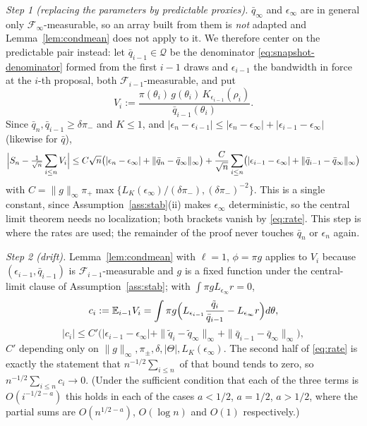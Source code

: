 \documentclass[10pt]{article}
\theoremstyle{plain}
\theoremstyle{definition}
\begin{document}
\emph{Step 1 (replacing the parameters by predictable proxies).} $\bar q_\infty$ and $\epsilon_\infty$ are in general only $\mathcal{F}_\infty$-measurable, so an array built from them is \emph{not} adapted and Lemma~\ref{lem:condmean} does not apply to it. We therefore center on the predictable pair instead: let $\bar q_{i-1}\in\mathcal{Q}$ be the denominator \eqref{eq:snapshot-denominator} formed from the first $i-1$ draws and $\epsilon_{i-1}$ the bandwidth in force at the $i$-th proposal, both $\mathcal{F}_{i-1}$-measurable, and put
\[
V_i:=\frac{\pi(\theta_i)\,g(\theta_i)\,K_{\epsilon_{i-1}}(\rho_i)}{\bar q_{i-1}(\theta_i)} .
\]
Since $\bar q_n,\bar q_{i-1}\ge\delta\pi_-$ and $K\le1$, and $|\epsilon_n-\epsilon_{i-1}|\le|\epsilon_n-\epsilon_\infty|+|\epsilon_{i-1}-\epsilon_\infty|$ (likewise for $\bar q$),
\[
\Bigl|S_n-\tfrac{1}{\sqrt n}\sum_{i\le n}V_i\Bigr|
\le C\sqrt n\bigl(|\epsilon_n-\epsilon_\infty|+\|\bar q_n-\bar q_\infty\|_\infty\bigr)
+\frac{C}{\sqrt n}\sum_{i\le n}\bigl(|\epsilon_{i-1}-\epsilon_\infty|+\|\bar q_{i-1}-\bar q_\infty\|_\infty\bigr)
\]
with $C=\|g\|_\infty\pi_+\max\{L_K(\epsilon_\infty)/(\delta\pi_-),(\delta\pi_-)^{-2}\}$. This is a single constant, since Assumption~\ref{ass:stab}(ii) makes $\epsilon_\infty$ deterministic, so the central limit theorem needs no localization; both brackets vanish by \eqref{eq:rate}. This step is where the rates are used; the remainder of the proof never touches $\bar q_n$ or $\epsilon_n$ again.

\emph{Step 2 (drift).} Lemma~\ref{lem:condmean} with $\ell=1$, $\phi=\pi g$ applies to $V_i$ because $(\epsilon_{i-1},\bar q_{i-1})$ is $\mathcal{F}_{i-1}$-measurable and $g$ is a fixed function under the central-limit clause of Assumption~\ref{ass:stab}; with $\int\pi gL_{\epsilon_\infty}r=0$,
\[
c_i:=\mathbb{E}_{i-1}V_i=\int\pi g\Bigl(L_{\epsilon_{i-1}}\frac{\tilde q_i}{\bar q_{i-1}}-L_{\epsilon_\infty}r\Bigr)d\theta,
\]
\[
|c_i|\le C'\bigl(|\epsilon_{i-1}-\epsilon_\infty|+\|\tilde q_i-\tilde q_\infty\|_\infty+\|\bar q_{i-1}-\bar q_\infty\|_\infty\bigr),
\]
$C'$ depending only on $\|g\|_\infty,\pi_\pm,\delta,|\Theta|,L_K(\epsilon_\infty)$. The second half of \eqref{eq:rate} is exactly the statement that $n^{-1/2}\sum_{i\le n}$ of that bound tends to zero, so $n^{-1/2}\sum_{i\le n}c_i\to0$. (Under the sufficient condition that each of the three terms is $O(i^{-1/2-a})$ this holds in each of the cases $a<1/2$, $a=1/2$, $a>1/2$, where the partial sums are $O(n^{1/2-a})$, $O(\log n)$ and $O(1)$ respectively.)
\end{document}
